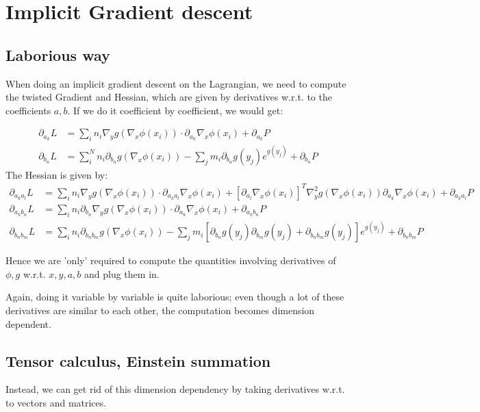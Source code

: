 \documentclass{article}
\theoremstyle{definition}
\theoremstyle{remark}
\newcommand{\1}{\mathbbm{1}}
\begin{document}
\section{Implicit Gradient descent}
\subsection{Laborious way}
When doing an implicit gradient descent on the Lagrangian, we need to compute the twisted Gradient and Hessian, which are given by derivatives w.r.t. to the coefficients $a,b$. If we do it coefficient by coefficient, we would get:

\begin{align*}
\partial_{a_k} L &= \sum_i n_i \nabla_y g(\nabla_x \phi(x_i)) \cdot \partial_{a_k} \nabla_x \phi(x_i) + \partial_{a_k} P \\
\partial_{b_n} L &= \sum_i^N n_i \partial_{b_n} g(\nabla_x \phi(x_i)) - \sum_j m_i \partial_{b_n} g(y_j) e^{g(y_j)} + \partial_{b_n} P
\end{align*}
The Hessian is given by:
\begin{align*}
\partial_{a_k a_l} L &= \sum_i n_i \nabla_y g(\nabla_x \phi(x_i)) \cdot \partial_{a_k a_l} \nabla_x \phi(x_i) + [\partial_{a_l} \nabla_x \phi(x_i)]^T \nabla_y^2 g (\nabla_x \phi(x_i)) \partial_{a_k} \nabla_x \phi(x_i) + \partial_{a_k a_l} P\\
\partial_{a_k b_n} L &= \sum_i n_i \partial_{b_n}\nabla_y g(\nabla_x \phi(x_i)) \cdot \partial_{a_k} \nabla_x \phi(x_i) + \partial_{a_k b_n} P\\
\partial_{b_n b_m} L &= \sum_i n_i \partial_{b_n b_m} g(\nabla_x \phi(x_i)) - \sum_j m_i \left[ \partial_{b_n} g(y_j)\partial_{b_m} g(y_j)+ \partial_{b_n b_m} g(y_j)\right]e^{g(y_j)} + \partial_{b_n b_m} P
\end{align*}

Hence we are 'only' required to compute the quantities involving derivatives of $\phi,g$ w.r.t. $x,y,a,b$ and plug them in.

Again, doing it variable by variable is quite laborious; even though a lot of these derivatives are similar to each other, the computation becomes dimension dependent. 

\subsection{Tensor calculus, Einstein summation}
Instead, we can get rid of this dimension dependency by taking derivatives w.r.t. to vectors and matrices.
\end{document}
